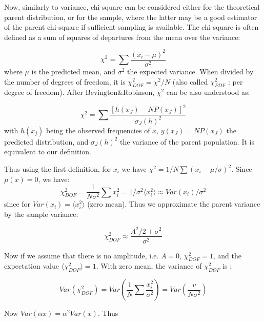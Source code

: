 \documentclass[fleqn,usenatbib]{mnras}  %
\begin{document}
Now,  similarly to variance, chi-square can be considered either for the theoretical parent distribution, or for the sample, where the latter may be a good estimator of the parent chi-square if sufficient sampling is available. The chi-square is often defined as a sum of squares of departures from the mean over the variance: 

\begin{equation}
\chi^{2} = \sum\frac{(x_{i} - \mu)^{2}}{\sigma^{2}}
\end{equation}
where $\mu$ is the predicted mean, and $\sigma^{2}$ the expected variance. When divided by the number of degrees of freedom, it is  $\chi^{2}_{DOF} = \chi^{2} / N$ (also called $\chi^{2}_{PDF}$ : per degree of freedom). After Bevington$\&$Robinson, $\chi^{2}$ can be also understood as:

\begin{equation}
\chi^{2} = \sum \frac{[h(x_{J}) - N P(x_{J})]^{2}}{\sigma_{J}(h)^{2}}
\end{equation} 
with $h(x_{j})$ being the observed frequencies of $x$,  $y(x_{J}) = N P(x_{J})$ the predicted distribution, and $\sigma_{J}(h)^{2}$ the variance of the parent population. It is equivalent to our definition.

Thus using the first definition, for $x_{i}$ we have  $\chi^{2} = {1/N} \sum(x_{i} - \mu / \sigma)^{2}$. Since  $\mu(x) = 0$, we have:
\begin{equation}
\chi^{2}_{DOF} = \frac{1}{N\sigma^{2}} \sum x_{i}^{2} = 1/\sigma^{2} \langle x_{i}^{2} \rangle \approx  Var(x_{i}) / \sigma^{2}
\end{equation}
since for $Var(x_{i}) =  \langle x_{i}^{2} \rangle $ (zero mean). Thus we approximate the  parent variance by the sample variance: 

\begin{equation}
\chi^{2}_{DOF} \approx \frac{A^{2}/2 + \sigma^{2}}{\sigma^{2}}
\end{equation}

Now if we assume that there is no amplitude, i.e. $A=0$, $\chi^{2}_{DOF} = 1$, and the expectation value $\langle \chi^{2}_{DOF} \rangle = 1$. With zero mean, the variance of $\chi^{2}_{DOF}$ is :

\begin{equation}
Var(\chi^{2}_{DOF}) = Var\left(\frac{1}{N} \sum \frac{x_{i}^{2}}{\sigma^{2}} \right) = Var\left(\frac{v}{N \sigma^{2}}\right)
\end{equation}

Now $Var(\alpha x) = \alpha^{2} Var(x)$. Thus 
\end{document}
